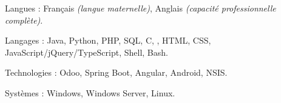 \begin{indentsection}{\parindent}
  \begin{description*}
    \item[Langues :]
    Français \emph{(langue maternelle)}, %
    Anglais \emph{(capacité professionnelle complète)}. %
    \item[Langages :] Java, Python, PHP, SQL, C, \Csharp, HTML,
    CSS, JavaScript/jQuery/TypeScript, Shell, Bash.
    \item[Technologies :] Odoo, Spring Boot, Angular, Android, NSIS.
    \item[Systèmes :] Windows, Windows Server, Linux.
  \end{description*}
\end{indentsection}
